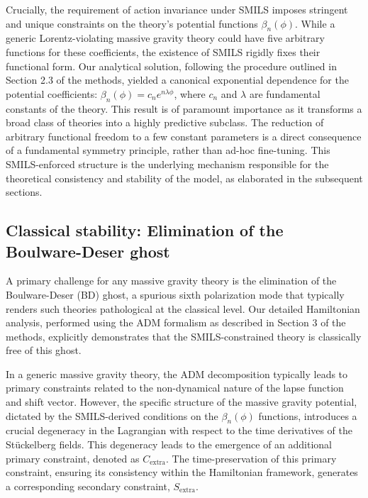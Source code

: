 \documentclass[twocolumn]{aastex631}
\begin{document}
Crucially, the requirement of action invariance under SMILS imposes stringent and unique constraints on the theory's potential functions $\beta_n(\phi)$. While a generic Lorentz-violating massive gravity theory could have five arbitrary functions for these coefficients, the existence of SMILS rigidly fixes their functional form. Our analytical solution, following the procedure outlined in Section 2.3 of the methods, yielded a canonical exponential dependence for the potential coefficients: $\beta_n(\phi) = c_n e^{n\lambda\phi}$, where $c_n$ and $\lambda$ are fundamental constants of the theory. This result is of paramount importance as it transforms a broad class of theories into a highly predictive subclass. The reduction of arbitrary functional freedom to a few constant parameters is a direct consequence of a fundamental symmetry principle, rather than ad-hoc fine-tuning. This SMILS-enforced structure is the underlying mechanism responsible for the theoretical consistency and stability of the model, as elaborated in the subsequent sections.

\subsection{Classical stability: Elimination of the Boulware-Deser ghost}
A primary challenge for any massive gravity theory is the elimination of the Boulware-Deser (BD) ghost, a spurious sixth polarization mode that typically renders such theories pathological at the classical level. Our detailed Hamiltonian analysis, performed using the ADM formalism as described in Section 3 of the methods, explicitly demonstrates that the SMILS-constrained theory is classically free of this ghost.

In a generic massive gravity theory, the ADM decomposition typically leads to primary constraints related to the non-dynamical nature of the lapse function and shift vector. However, the specific structure of the massive gravity potential, dictated by the SMILS-derived conditions on the $\beta_n(\phi)$ functions, introduces a crucial degeneracy in the Lagrangian with respect to the time derivatives of the Stückelberg fields. This degeneracy leads to the emergence of an additional primary constraint, denoted as $C_{\text{extra}}$. The time-preservation of this primary constraint, ensuring its consistency within the Hamiltonian framework, generates a corresponding secondary constraint, $S_{\text{extra}}$.
\end{document}
